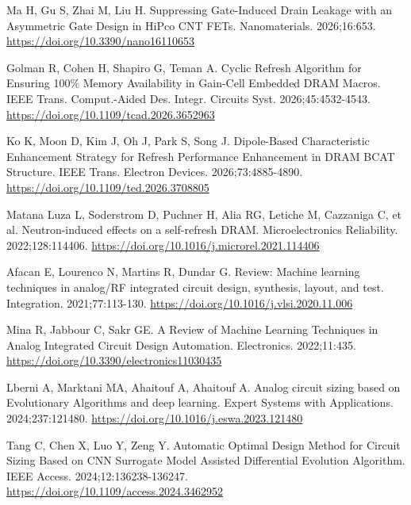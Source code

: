 Ma H, Gu S, Zhai M, Liu H. Suppressing Gate-Induced Drain Leakage with an Asymmetric Gate Design in HiPco CNT FETs. Nanomaterials. 2026;16:653.
\href{https://doi.org/10.3390/nano16110653}{https://doi.org/10.3390/nano16110653}

Golman R, Cohen H, Shapiro G, Teman A. Cyclic Refresh Algorithm for Ensuring 100\% Memory Availability in Gain-Cell Embedded DRAM Macros. IEEE Trans. Comput.-Aided Des. Integr. Circuits Syst. 2026;45:4532-4543.
\href{https://doi.org/10.1109/tcad.2026.3652963}{https://doi.org/10.1109/tcad.2026.3652963}

Ko K, Moon D, Kim J, Oh J, Park S, Song J. Dipole-Based Characteristic Enhancement Strategy for Refresh Performance Enhancement in DRAM BCAT Structure. IEEE Trans. Electron Devices. 2026;73:4885-4890.
\href{https://doi.org/10.1109/ted.2026.3708805}{https://doi.org/10.1109/ted.2026.3708805}

Matana Luza L, Soderstrom D, Puchner H, Alia RG, Letiche M, Cazzaniga C, et al. Neutron-induced effects on a self-refresh DRAM. Microelectronics Reliability. 2022;128:114406.
\href{https://doi.org/10.1016/j.microrel.2021.114406}{https://doi.org/10.1016/j.microrel.2021.114406}

Afacan E, Lourenco N, Martins R, Dundar G. Review: Machine learning techniques in analog/RF integrated circuit design, synthesis, layout, and test. Integration. 2021;77:113-130.
\href{https://doi.org/10.1016/j.vlsi.2020.11.006}{https://doi.org/10.1016/j.vlsi.2020.11.006}

Mina R, Jabbour C, Sakr GE. A Review of Machine Learning Techniques in Analog Integrated Circuit Design Automation. Electronics. 2022;11:435.
\href{https://doi.org/10.3390/electronics11030435}{https://doi.org/10.3390/electronics11030435}

Lberni A, Marktani MA, Ahaitouf A, Ahaitouf A. Analog circuit sizing based on Evolutionary Algorithms and deep learning. Expert Systems with Applications. 2024;237:121480.
\href{https://doi.org/10.1016/j.eswa.2023.121480}{https://doi.org/10.1016/j.eswa.2023.121480}

Tang C, Chen X, Luo Y, Zeng Y. Automatic Optimal Design Method for Circuit Sizing Based on CNN Surrogate Model Assisted Differential Evolution Algorithm. IEEE Access. 2024;12:136238-136247.
\href{https://doi.org/10.1109/access.2024.3462952}{https://doi.org/10.1109/access.2024.3462952}

